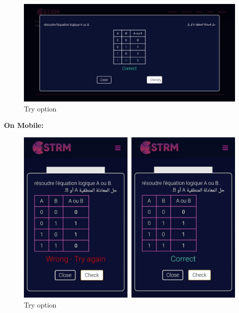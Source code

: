 \begin{figure}[ht]
	\centering
	\label{}\includegraphics[scale=0.5]{img/12.png}                
	\caption{Try option} 
	\label{fig:try3}
\end{figure} 
\newpage

\textbf{On Mobile:}
\begin{figure}[ht]
	\centering
	\label{}\includegraphics[scale=0.45]{img/333.jpg}                
	\caption{Try option} 
	\label{fig:try4}
\end{figure}
\newpage
